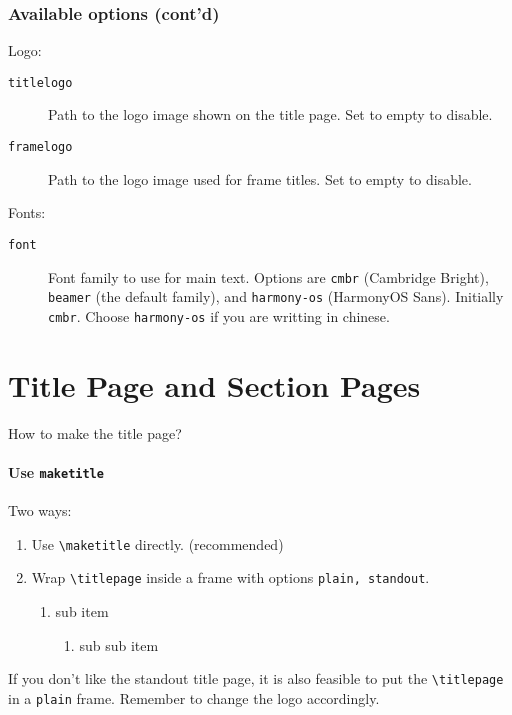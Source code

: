 \documentclass[no-math, aspectratio=1610, 10pt]{beamer}
\begin{document}
    \begin{frame}
        \frametitle{Available options (cont'd)}

        Logo:
        \begin{description}
            \item[\texttt{titlelogo}] Path to the logo image shown on the title page. Set to empty to disable.
            \item[\texttt{framelogo}] Path to the logo image used for frame titles. Set to empty to disable. 
        \end{description}
    
        Fonts:
        \begin{description}
            \item[\texttt{font}] Font family to use for main text. Options are \texttt{cmbr} (Cambridge Bright), \texttt{beamer} (the default family), and \texttt{harmony-os} (HarmonyOS Sans). Initially \texttt{cmbr}. Choose \texttt{harmony-os} if you are writting in chinese.
        \end{description}
    \end{frame}

    \section{Title Page and Section Pages}

    \begin{frame}[fragile]{How to make the title page?}
        \framesubtitle{Use \texttt{maketitle}}
        Two ways:
        \begin{enumerate}
            \item Use \verb|\maketitle| directly. (recommended)
            \item Wrap \verb|\titlepage| inside a frame with options \texttt{plain, standout}.
            \begin{enumerate}
                \item sub item
                \begin{enumerate}
                    \item sub sub item
                \end{enumerate}
            \end{enumerate}
        \end{enumerate}

        If you don't like the standout title page, it is also feasible to put the \verb|\titlepage| in a \texttt{plain} frame. Remember to change the logo accordingly.
    \end{frame}
\end{document}
